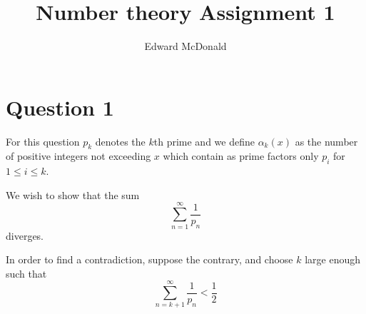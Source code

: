 \documentclass[10pt]{article}
\title{Number theory Assignment 1}
\author{Edward McDonald}
\date{}
\begin{document}
\section*{Question 1}
For this question $p_k$ denotes the $k$th prime
and we define $\alpha_k(x)$ as the number of positive integers
not exceeding $x$ which contain as prime factors
only $p_i$ for $1\leq i \leq k$.

We wish to show that the sum 
\begin{equation*}
    \sum_{n=1}^\infty \frac{1}{p_n}
\end{equation*}
diverges.

In order to find a contradiction, suppose the contrary, and choose
$k$ large enough such that
\begin{equation*}
    \sum_{n=k+1}^\infty \frac{1}{p_n} < \frac{1}{2}
\end{equation*}
\end{document}
